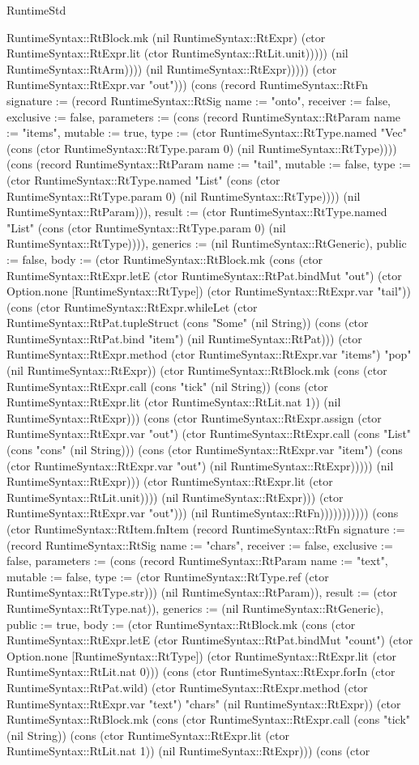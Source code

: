 \begin{lexlean}{RuntimeStd}
\begin{semanticmodule}
{RuntimeSyntax::RtBlock.mk (nil RuntimeSyntax::RtExpr) (ctor RuntimeSyntax::RtExpr.lit (ctor RuntimeSyntax::RtLit.unit))))) (nil RuntimeSyntax::RtArm)))) (nil RuntimeSyntax::RtExpr))))) (ctor RuntimeSyntax::RtExpr.var "out"))}) (cons (record RuntimeSyntax::RtFn {signature := (record RuntimeSyntax::RtSig {name := "onto", receiver := false, exclusive := false, parameters := (cons (record RuntimeSyntax::RtParam {name := "items", mutable := true, type := (ctor RuntimeSyntax::RtType.named "Vec" (cons (ctor RuntimeSyntax::RtType.param 0) (nil RuntimeSyntax::RtType)))}) (cons (record RuntimeSyntax::RtParam {name := "tail", mutable := false, type := (ctor RuntimeSyntax::RtType.named "List" (cons (ctor RuntimeSyntax::RtType.param 0) (nil RuntimeSyntax::RtType)))}) (nil RuntimeSyntax::RtParam))), result := (ctor RuntimeSyntax::RtType.named "List" (cons (ctor RuntimeSyntax::RtType.param 0) (nil RuntimeSyntax::RtType)))}), generics := (nil RuntimeSyntax::RtGeneric), public := false, body := (ctor RuntimeSyntax::RtBlock.mk (cons (ctor RuntimeSyntax::RtExpr.letE (ctor RuntimeSyntax::RtPat.bindMut "out") (ctor Option.none [RuntimeSyntax::RtType]) (ctor RuntimeSyntax::RtExpr.var "tail")) (cons (ctor RuntimeSyntax::RtExpr.whileLet (ctor RuntimeSyntax::RtPat.tupleStruct (cons "Some" (nil String)) (cons (ctor RuntimeSyntax::RtPat.bind "item") (nil RuntimeSyntax::RtPat))) (ctor RuntimeSyntax::RtExpr.method (ctor RuntimeSyntax::RtExpr.var "items") "pop" (nil RuntimeSyntax::RtExpr)) (ctor RuntimeSyntax::RtBlock.mk (cons (ctor RuntimeSyntax::RtExpr.call (cons "tick" (nil String)) (cons (ctor RuntimeSyntax::RtExpr.lit (ctor RuntimeSyntax::RtLit.nat 1)) (nil RuntimeSyntax::RtExpr))) (cons (ctor RuntimeSyntax::RtExpr.assign (ctor RuntimeSyntax::RtExpr.var "out") (ctor RuntimeSyntax::RtExpr.call (cons "List" (cons "cons" (nil String))) (cons (ctor RuntimeSyntax::RtExpr.var "item") (cons (ctor RuntimeSyntax::RtExpr.var "out") (nil RuntimeSyntax::RtExpr))))) (nil RuntimeSyntax::RtExpr))) (ctor RuntimeSyntax::RtExpr.lit (ctor RuntimeSyntax::RtLit.unit)))) (nil RuntimeSyntax::RtExpr))) (ctor RuntimeSyntax::RtExpr.var "out"))}) (nil RuntimeSyntax::RtFn))))))))))) (cons (ctor RuntimeSyntax::RtItem.fnItem (record RuntimeSyntax::RtFn {signature := (record RuntimeSyntax::RtSig {name := "chars", receiver := false, exclusive := false, parameters := (cons (record RuntimeSyntax::RtParam {name := "text", mutable := false, type := (ctor RuntimeSyntax::RtType.ref (ctor RuntimeSyntax::RtType.str))}) (nil RuntimeSyntax::RtParam)), result := (ctor RuntimeSyntax::RtType.nat)}), generics := (nil RuntimeSyntax::RtGeneric), public := true, body := (ctor RuntimeSyntax::RtBlock.mk (cons (ctor RuntimeSyntax::RtExpr.letE (ctor RuntimeSyntax::RtPat.bindMut "count") (ctor Option.none [RuntimeSyntax::RtType]) (ctor RuntimeSyntax::RtExpr.lit (ctor RuntimeSyntax::RtLit.nat 0))) (cons (ctor RuntimeSyntax::RtExpr.forIn (ctor RuntimeSyntax::RtPat.wild) (ctor RuntimeSyntax::RtExpr.method (ctor RuntimeSyntax::RtExpr.var "text") "chars" (nil RuntimeSyntax::RtExpr)) (ctor RuntimeSyntax::RtBlock.mk (cons (ctor RuntimeSyntax::RtExpr.call (cons "tick" (nil String)) (cons (ctor RuntimeSyntax::RtExpr.lit (ctor RuntimeSyntax::RtLit.nat 1)) (nil RuntimeSyntax::RtExpr))) (cons (ctor }
\end{semanticmodule}
\end{lexlean}
